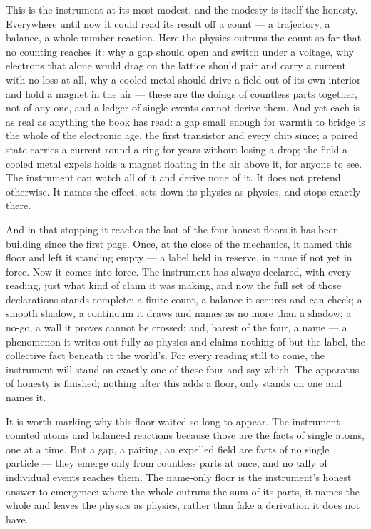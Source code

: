 This is the instrument at its most modest, and the modesty is itself the honesty. Everywhere until now it could
read its result off a count --- a trajectory, a balance, a whole-number reaction. Here the physics outruns the
count so far that no counting reaches it: why a gap should open and switch under a voltage, why electrons that
alone would drag on the lattice should pair and carry a current with no loss at all, why a cooled metal should
drive a field out of its own interior and hold a magnet in the air --- these are the doings of countless parts
together, not of any one, and a ledger of single events cannot derive them. And yet each is as real as anything
the book has read: a gap small enough for warmth to bridge is the whole of the electronic age, the first
transistor and every chip since; a paired state carries a current round a ring for years without losing a drop;
the field a cooled metal expels holds a magnet floating in the air above it, for anyone to see. The instrument
can watch all of it and derive none of it. It does not pretend otherwise. It names the effect, sets down its
physics as physics, and stops exactly there.

And in that stopping it reaches the last of the four honest floors it has been building since the first page.
Once, at the close of the mechanics, it named this floor and left it standing empty --- a label held in reserve,
in name if not yet in force. Now it comes into force. The instrument has always declared, with every reading,
just what kind of claim it was making, and now the full set of those declarations stands complete: a finite
count, a balance it secures and can check; a smooth shadow, a continuum it draws and names as no more than a
shadow; a no-go, a wall it proves cannot be crossed; and, barest of the four, a name --- a phenomenon it writes
out fully as physics and claims nothing of but the label, the collective fact beneath it the world's. For every
reading still to come, the instrument will stand on exactly one of these four and say which. The apparatus of
honesty is finished; nothing after this adds a floor, only stands on one and names it.

It is worth marking why this floor waited so long to appear. The instrument counted atoms and balanced
reactions because those are the facts of single atoms, one at a time. But a gap, a pairing, an expelled field
are facts of no single particle --- they emerge only from countless parts at once, and no tally of individual
events reaches them. The name-only floor is the instrument's honest answer to emergence: where the whole
outruns the sum of its parts, it names the whole and leaves the physics as physics, rather than fake a
derivation it does not have.


